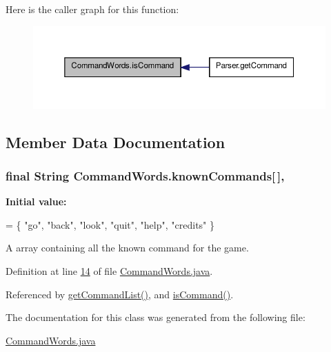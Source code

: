 Here is the caller graph for this function\-:\nopagebreak
\begin{figure}[H]
\begin{center}
\leavevmode
\includegraphics[width=350pt]{classCommandWords_a98619d278b3fa23fed18b5834f9d20a8_icgraph}
\end{center}
\end{figure}




\subsection{Member Data Documentation}
\hypertarget{classCommandWords_a328bb081d9a9e5cb1aa6362523b28783}{
\subsubsection[{known\-Commands}]{\setlength{\rightskip}{0pt plus 5cm}final String Command\-Words.\-known\-Commands\mbox{[}$\,$\mbox{]}\hspace{0.3cm}{\ttfamily [static]}, {\ttfamily [private]}}}\label{classCommandWords_a328bb081d9a9e5cb1aa6362523b28783}
{\bfseries Initial value\-:}
\begin{DoxyCode}
= \{
        \textcolor{stringliteral}{"go"}, \textcolor{stringliteral}{"back"}, \textcolor{stringliteral}{"look"}, \textcolor{stringliteral}{"quit"}, \textcolor{stringliteral}{"help"}, \textcolor{stringliteral}{"credits"}
    \}
\end{DoxyCode}
A array containing all the known command for the game. 

Definition at line \hyperlink{CommandWords_8java_source_l00014}{14} of file \hyperlink{CommandWords_8java_source}{Command\-Words.\-java}.



Referenced by \hyperlink{CommandWords_8java_source_l00039}{get\-Command\-List()}, and \hyperlink{CommandWords_8java_source_l00028}{is\-Command()}.



The documentation for this class was generated from the following file\-:\begin{DoxyCompactItemize}
\item 
\hyperlink{CommandWords_8java}{Command\-Words.\-java}\end{DoxyCompactItemize}
